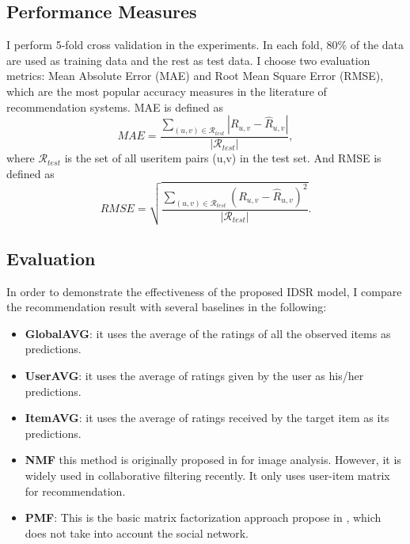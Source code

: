 \subsection{Performance Measures}
I perform 5-fold cross validation in the experiments. In each fold, 80\% of the data are used as training data and the rest as test data. I choose two evaluation metrics: Mean Absolute Error (MAE) and Root Mean Square Error (RMSE), which are the most popular accuracy measures in the literature of recommendation systems.
MAE is defined as
\begin{equation}
MAE = \frac{\sum_{(u,v) \in \mathcal{R}_{test}}{|R_{u,v} - \hat{R}_{u,v}|}}{|\mathcal{R}_{test}|},
\end{equation} 
where $\mathcal{R}_{test}$ is the set of all user\-item pairs (u,v) in the test set. And RMSE is defined as
\begin{equation}
RMSE = \sqrt{\frac{\sum_{(u,v) \in \mathcal{R}_{test}}{(R_{u,v} - \hat{R}_{u,v})^2}}{|\mathcal{R}_{test}|}}.
\end{equation}
\subsection{Evaluation}
In order to demonstrate the effectiveness of the proposed IDSR model, I compare the recommendation result with several baselines in the following:
\begin{itemize}
	\item \textbf{GlobalAVG}: it uses the average of the ratings of all the observed items as predictions.
	\item \textbf{UserAVG}: it uses the average of ratings given by the user as his/her predictions.
	\item \textbf{ItemAVG}: it uses the average of ratings received by the target item as its predictions.
	\item \textbf{NMF} this method is originally proposed in \cite{lee1999learning} for image analysis. However, it is widely used in collaborative filtering recently. It only uses user-item matrix for recommendation.
	\item \textbf{PMF}: This is the basic matrix factorization approach propose in \cite{mnih2007probabilistic} , which does not take into account the social network.
\end{itemize}

